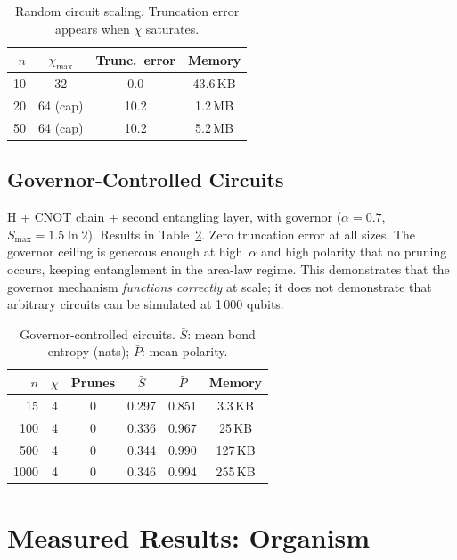 \documentclass{article}
\begin{document}
\begin{table}[h]
  \caption{Random circuit scaling.  Truncation error appears when $\chi$ saturates.}
  \label{tab:random}
  \centering
  \begin{tabular}{rccc}
    \toprule
    $n$ & $\chi_{\max}$ & Trunc.\ error & Memory \\
    \midrule
    10 & 32         & 0.0  &  43.6\,KB \\
    20 & 64 (cap)   & 10.2 &   1.2\,MB \\
    50 & 64 (cap)   & 10.2 &   5.2\,MB \\
    \bottomrule
  \end{tabular}
\end{table}

\subsection{Governor-Controlled Circuits}

H + CNOT chain + second entangling layer, with governor ($\alpha=0.7$, $S_{\max}=1.5\ln 2$).  Results in Table~\ref{tab:governor}.  Zero truncation error at all sizes.  The governor ceiling is generous enough at high~$\alpha$ and high polarity that no pruning occurs, keeping entanglement in the area-law regime.  This demonstrates that the governor mechanism \emph{functions correctly} at scale; it does not demonstrate that arbitrary circuits can be simulated at 1\,000 qubits.

\begin{table}[h]
  \caption{Governor-controlled circuits.  $\bar{S}$: mean bond entropy (nats); $\bar{P}$: mean polarity.}
  \label{tab:governor}
  \centering
  \begin{tabular}{rccccc}
    \toprule
    $n$ & $\chi$ & Prunes & $\bar{S}$ & $\bar{P}$ & Memory \\
    \midrule
      15 & 4 & 0 & 0.297 & 0.851 &   3.3\,KB \\
     100 & 4 & 0 & 0.336 & 0.967 &  25\,KB \\
     500 & 4 & 0 & 0.344 & 0.990 & 127\,KB \\
    1000 & 4 & 0 & 0.346 & 0.994 & 255\,KB \\
    \bottomrule
  \end{tabular}
\end{table}

\section{Measured Results: Organism}
\end{document}
